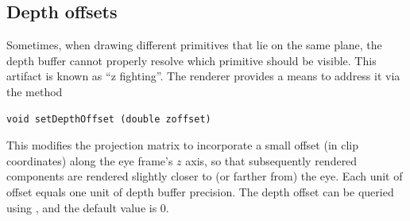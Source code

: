 \subsection{Depth offsets}
\label{depthOffset:sec}

Sometimes, when drawing different primitives that lie on the same
plane, the depth buffer cannot properly resolve which primitive should
be visible. This artifact is known as ``z fighting''. The renderer
provides a means to address it via the method
%
\begin{lstlisting}[]
void setDepthOffset (double zoffset)
\end{lstlisting}
%
This modifies the projection matrix to incorporate a small offset (in
clip coordinates) along the eye frame's $z$ axis, so that subsequently
rendered components are rendered slightly closer to (or farther from)
the eye. Each unit of offset equals one unit of depth buffer
precision. The depth offset can be queried using
, and the
default value is 0.

